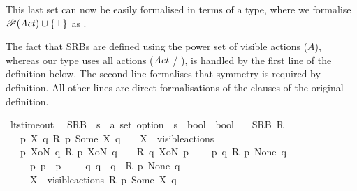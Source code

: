 \begin{isabellebody}
\begin{isamarkuptext}
This last set can now be easily formalised in terms of a type, where we formalise
$\mathscr{P}(\mathit{Act}) \cup \{\bot\}$
as .

The fact that SRBs are defined using the power set of visible actions ($A$), whereas our type uses all actions ($\mathit{Act}$ / ), is handled by the first line of the definition below. The second line formalises that symmetry is required by definition. All other lines are direct formalisations of the clauses of the original definition.%
\end{isamarkuptext}\isamarkuptrue%
\isamarkupfalse%
\ lts{\isacharunderscore}{\kern0pt}timeout\ \isanewline
\isanewline
%
\isanewline
{}\isamarkupfalse%
\ SRB\ {\isacharcolon}{\kern0pt}{\isacharcolon}{\kern0pt}\ {\isacartoucheopen}{\isacharparenleft}{\kern0pt}{\isacharprime}{\kern0pt}s\ {\isasymRightarrow}\ {\isacharprime}{\kern0pt}a\ set\ option\ {\isasymRightarrow}\ {\isacharprime}{\kern0pt}s\ {\isasymRightarrow}\ bool{\isacharparenright}{\kern0pt}\ {\isasymRightarrow}\ bool{\isacartoucheclose}\isanewline
\ \ \ {\isacartoucheopen}SRB\ R\ {\isasymequiv}\isanewline
\ \ {\isacharparenleft}{\kern0pt}{\isasymforall}\ p\ X\ q{\isachardot}{\kern0pt}\ R\ p\ {\isacharparenleft}{\kern0pt}Some\ X{\isacharparenright}{\kern0pt}\ q\ \ {\isasymlongrightarrow}\ \ X\ {\isasymsubseteq}\ visible{\isacharunderscore}{\kern0pt}actions{\isacharparenright}{\kern0pt}\ {\isasymand}\isanewline
\ \ {\isacharparenleft}{\kern0pt}{\isasymforall}\ p\ XoN\ q{\isachardot}{\kern0pt}\ R\ p\ XoN\ q\ \ {\isasymlongrightarrow}\ \ R\ q\ XoN\ p{\isacharparenright}{\kern0pt}\ {\isasymand}\isanewline
\isanewline
\ \ {\isacharparenleft}{\kern0pt}{\isasymforall}\ p\ q{\isachardot}{\kern0pt}\ R\ p\ None\ q\ {\isasymlongrightarrow}\isanewline
\ \ \ \ {\isacharparenleft}{\kern0pt}{\isasymforall}\ p{\isacharprime}{\kern0pt}{\isachardot}{\kern0pt}\ p\ {\isasymlongmapsto}{\isasymtau}\ p{\isacharprime}{\kern0pt}\ \ {\isasymlongrightarrow}\ \ {\isacharparenleft}{\kern0pt}{\isasymexists}\ q{\isacharprime}{\kern0pt}{\isachardot}{\kern0pt}\ {\isacharparenleft}{\kern0pt}q\ {\isasymlongmapsto}{\isasymtau}\ q{\isacharprime}{\kern0pt}{\isacharparenright}{\kern0pt}\ {\isasymand}\ R\ p{\isacharprime}{\kern0pt}\ None\ q{\isacharprime}{\kern0pt}{\isacharparenright}{\kern0pt}{\isacharparenright}{\kern0pt}\ {\isasymand}\isanewline
\ \ \ \ {\isacharparenleft}{\kern0pt}{\isasymforall}\ X\ {\isasymsubseteq}\ visible{\isacharunderscore}{\kern0pt}actions{\isachardot}{\kern0pt}\ {\isacharparenleft}{\kern0pt}R\ p\ {\isacharparenleft}{\kern0pt}Some\ X{\isacharparenright}{\kern0pt}\ q{\isacharparenright}{\kern0pt}{\isacharparenright}{\kern0pt}{\isacharparenright}{\kern0pt}\ {\isasymand}\isanewline

\end{isabellebody}
